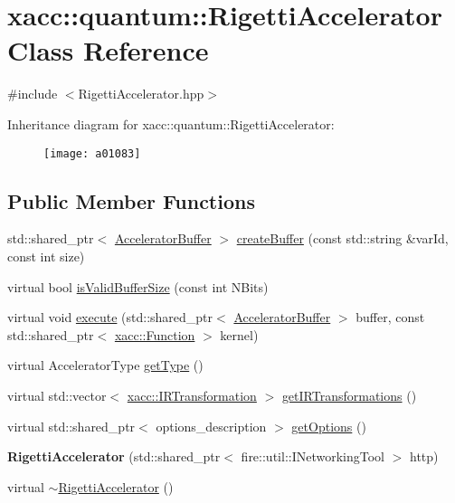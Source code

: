 \hypertarget{a01083}{}\section{xacc\+:\+:quantum\+:\+:Rigetti\+Accelerator Class Reference}
\label{a01083}


{\ttfamily \#include $<$Rigetti\+Accelerator.\+hpp$>$}

Inheritance diagram for xacc\+:\+:quantum\+:\+:Rigetti\+Accelerator\+:\begin{figure}[H]
\begin{center}
\leavevmode
\texttt{[image: a01083]}
\end{center}
\end{figure}
\subsection*{Public Member Functions}
\begin{DoxyCompactItemize}
\item 
std\+::shared\+\_\+ptr$<$ \hyperlink{a01447}{Accelerator\+Buffer} $>$ \hyperlink{a01083_a731551c94b1abef40d2cf032e8712df6}{create\+Buffer} (const std\+::string \&var\+Id, const int size)
\item 
virtual bool \hyperlink{a01083_a61352c07062597aad2393fbeed4cc025}{is\+Valid\+Buffer\+Size} (const int N\+Bits)
\item 
virtual void \hyperlink{a01083_afce7bbd1b0f04300a9920952e9d12ef4}{execute} (std\+::shared\+\_\+ptr$<$ \hyperlink{a01447}{Accelerator\+Buffer} $>$ buffer, const std\+::shared\+\_\+ptr$<$ \hyperlink{a01475}{xacc\+::\+Function} $>$ kernel)
\item 
virtual Accelerator\+Type \hyperlink{a01083_aab0d4674da5273d55407b9ab77cde890}{get\+Type} ()
\item 
virtual std\+::vector$<$ \hyperlink{a01503}{xacc\+::\+I\+R\+Transformation} $>$ \hyperlink{a01083_a443683a1dfb000603c640b2ee303cf66}{get\+I\+R\+Transformations} ()
\item 
virtual std\+::shared\+\_\+ptr$<$ options\+\_\+description $>$ \hyperlink{a01083_a9ee9e62aecbccf193894ca3388676f9f}{get\+Options} ()
\item 
\mbox{\label{a01083_aa92ba39441ec9c261fbddee23a84d6ac}} 
{\bfseries Rigetti\+Accelerator} (std\+::shared\+\_\+ptr$<$ fire\+::util\+::\+I\+Networking\+Tool $>$ http)
\item 
virtual \hyperlink{a01083_a7c86895d1c29afa8b7e18476144a3fcf}{$\sim$\+Rigetti\+Accelerator} ()
\end{DoxyCompactItemize}
